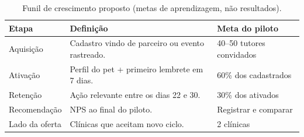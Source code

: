 \begin{table}[H]
\centering\small
\caption{Funil de crescimento proposto (metas de aprendizagem, não resultados).}
\begin{tabularx}{\textwidth}{P{3.2cm}YP{3.2cm}}
\toprule
\textbf{Etapa} & \textbf{Definição} & \textbf{Meta do piloto} \\
\midrule
Aquisição & Cadastro vindo de parceiro ou evento rastreado. & 40--50 tutores convidados \\
Ativação & Perfil do pet + primeiro lembrete em 7 dias. & 60\% dos cadastrados \\
Retenção & Ação relevante entre os dias 22 e 30. & 30\% dos ativados \\
Recomendação & NPS ao final do piloto. & Registrar e comparar \\
Lado da oferta & Clínicas que aceitam novo ciclo. & 2 clínicas \\
\bottomrule
\end{tabularx}
\end{table}
